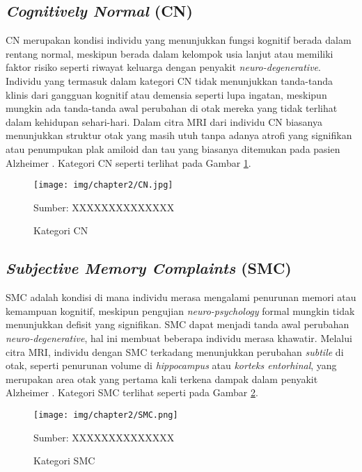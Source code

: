     \subsection{\textit{Cognitively Normal} (CN)}
    CN merupakan kondisi individu yang menunjukkan fungsi kognitif berada dalam rentang normal, meskipun berada dalam kelompok usia lanjut atau memiliki faktor risiko seperti riwayat keluarga dengan penyakit \textit{neuro-degenerative}. Individu yang termasuk dalam kategori CN tidak menunjukkan tanda-tanda klinis dari gangguan kognitif atau demensia seperti lupa ingatan, meskipun mungkin ada tanda-tanda awal perubahan di otak mereka yang tidak terlihat dalam kehidupan sehari-hari. Dalam citra MRI dari individu CN biasanya menunjukkan struktur otak yang masih utuh tanpa adanya atrofi yang signifikan atau penumpukan plak amiloid dan tau yang biasanya ditemukan pada pasien Alzheimer \autocite{Xie2023}. Kategori CN seperti terlihat pada Gambar \ref{fig:cn}.
    \begin{figure}[H] 
        \begin{center} 
            \texttt{[image: img/chapter2/CN.jpg]}
            \caption{Kategori CN} 
            \label{fig:cn}
            Sumber: XXXXXXXXXXXXXX
        \end{center} 
    \end{figure}

    \subsection{\textit{Subjective Memory Complaints} (SMC)}
    SMC adalah kondisi di mana individu merasa mengalami penurunan memori atau kemampuan kognitif, meskipun pengujian \textit{neuro-psychology} formal mungkin tidak menunjukkan defisit yang signifikan. SMC dapat menjadi tanda awal perubahan \textit{neuro-degenerative}, hal ini membuat beberapa individu merasa khawatir. Melalui citra MRI, individu dengan SMC terkadang menunjukkan perubahan \textit{subtile} di otak, seperti penurunan volume di \textit{hippocampus} atau \textit{korteks entorhinal}, yang merupakan area otak yang pertama kali terkena dampak dalam penyakit Alzheimer \autocite{Dhana2022}. Kategori SMC terlihat seperti pada Gambar \ref{fig:smc}.
    \begin{figure}[H] 
        \begin{center} 
            \texttt{[image: img/chapter2/SMC.png]}
            \caption{Kategori SMC} 
            \label{fig:smc}
            Sumber: XXXXXXXXXXXXXX
        \end{center} 
    \end{figure}

